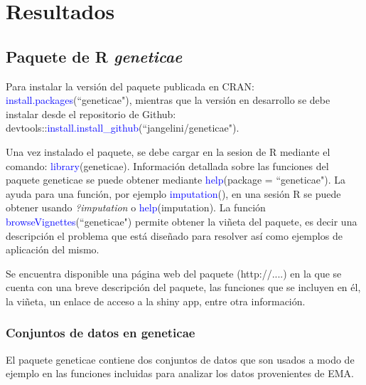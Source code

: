 

\chapter{Resultados}

\section{Paquete de R \emph{geneticae}}

Para instalar la versión del paquete publicada en CRAN: \textcolor{blue}{install.packages}(``geneticae"), mientras que la versión en desarrollo se debe instalar desde el repositorio de Github: devtools::\textcolor{blue}{install.install_github}(``jangelini/geneticae"). 

Una vez instalado el paquete, se debe cargar en la sesion de R mediante el comando: \textcolor{blue}{library}(geneticae). Información detallada sobre las funciones del paquete geneticae se puede obtener mediante \textcolor{blue}{help}(package = ``geneticae"). La ayuda para una función, por ejemplo \textcolor{blue}{imputation}(), en una sesión R se puede obtener usando \emph{?imputation} o \textcolor{blue}{help}(imputation). La función \textcolor{blue}{browseVignettes}(``geneticae") permite obtener la viñeta del paquete, es decir una descripción el problema que está diseñado para resolver así como ejemplos de aplicación del mismo. 

Se encuentra disponible una página web del paquete (http://....) en la que se cuenta con una breve descripción del paquete, las funciones que se incluyen en él, la viñeta, un enlace de acceso a la shiny app, entre otra información.


\subsection{Conjuntos de datos en geneticae}

El paquete geneticae contiene dos conjuntos de datos que son usados a modo de ejemplo en las funciones incluidas para analizar los datos provenientes de EMA.


